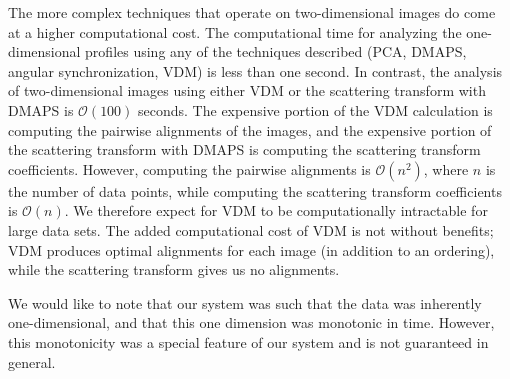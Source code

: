 \documentclass[10pt]{article}
\begin{document}
The more complex techniques that operate on two-dimensional images do come at a higher computational cost. 
%
The computational time for analyzing the one-dimensional profiles using any of the techniques described (PCA, DMAPS, angular synchronization, VDM) is less than one second. 
%
In contrast, the analysis of two-dimensional images using either VDM or the scattering transform with DMAPS is $\mathcal{O}(100)$ seconds.
%
The expensive portion of the VDM calculation is computing the pairwise alignments of the images, and the expensive portion of the scattering transform with DMAPS is computing the scattering transform coefficients.
%
However, computing the pairwise alignments is $\mathcal{O}(n^2)$, where $n$ is the number of data points, while computing the scattering transform coefficients is $\mathcal{O}(n)$.
%
We therefore expect for VDM to be computationally intractable for large data sets.
%
The added computational cost of VDM is not without benefits; VDM produces optimal alignments for each image (in addition to an ordering), while the scattering transform gives us no alignments.

We would like to note that our system was such that the data was inherently one-dimensional, and that this one dimension was monotonic in time.
%
However, this monotonicity was a special feature of our system and is not guaranteed in general.


\end{document}
